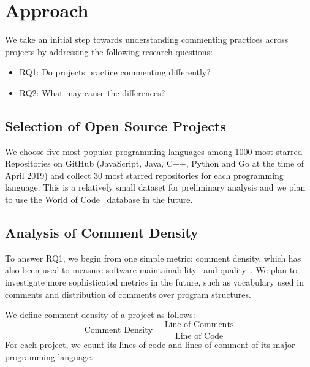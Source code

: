 \documentclass[sigconf,screen]{acmart}
\begin{document}
\section{Approach}
We take an initial step towards understanding commenting practices across projects by addressing the following research questions:
\begin{itemize}
\item RQ1: Do projects practice commenting differently?
\item RQ2: What may cause the differences?
\end{itemize}

\subsection{Selection of Open Source Projects}
We choose five most popular programming languages among 1000 most starred Repositories on GitHub (JavaScript, Java, C++, Python and Go at the time of April 2019) and collect 30 most starred repositories for each programming language. This is a relatively small dataset for preliminary analysis and we plan to use the World of Code~\cite{2019MSR-WorldOfCode} database in the future.

\subsection{Analysis of Comment Density}
To answer RQ1, we begin from one simple metric: comment density, which has also been used to measure software maintainability~\cite{POman1992ICSM} and quality~\cite{StamelosAOB02CodeQualityAnalysis}.
We plan to investigate more sophisticated metrics in the future, such as vocabulary used in comments and distribution of comments over program structures. %

We define comment density of a project as follows:
\begin{equation}
    \mbox{Comment Density} = \frac{\mbox{Line of Comments}}{\mbox{Line of Code}}
\end{equation}
For each project, we count its lines of code and lines of comment of its major programming language. 
\end{document}
